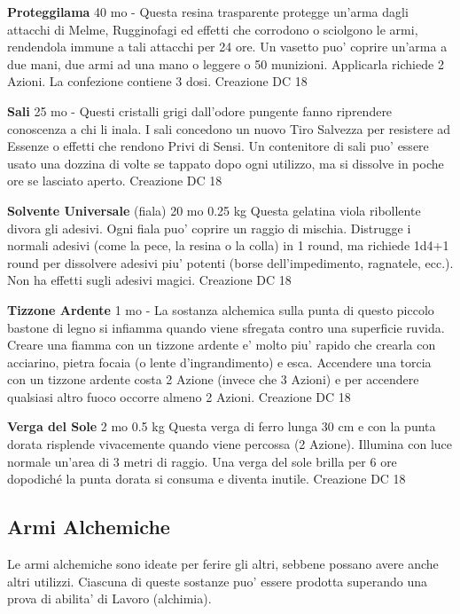 \documentclass[a4paper,11pt,twoside,openany]{book}
\begin{document}
{\textbf{Proteggilama} 40 mo - Questa resina trasparente protegge un'arma dagli attacchi di Melme, Rugginofagi ed effetti che corrodono o sciolgono le armi, rendendola immune a tali attacchi per 24 ore. Un vasetto puo' coprire un'arma a due mani, due armi ad una mano o leggere o 50 munizioni. Applicarla richiede 2 Azioni. La confezione contiene 3 dosi. Creazione DC 18

\textbf{Sali} 25 mo - Questi cristalli grigi dall'odore pungente fanno riprendere conoscenza a chi li inala. I sali concedono un nuovo Tiro Salvezza per resistere ad Essenze o effetti che rendono Privi di Sensi.
Un contenitore di sali puo' essere usato una dozzina di volte se tappato dopo ogni utilizzo, ma si dissolve in poche ore se lasciato aperto. Creazione DC 18

\textbf{Solvente Universale} (fiala) 20 mo 0.25 kg Questa gelatina viola ribollente divora gli adesivi. Ogni fiala puo' coprire un raggio di mischia. Distrugge i normali adesivi (come la pece, la resina o la colla) in 1 round, ma richiede 1d4+1 round per dissolvere adesivi piu' potenti (borse dell'impedimento, ragnatele, ecc.). Non ha effetti sugli adesivi magici. Creazione DC 18

\textbf{Tizzone Ardente} 1 mo - La sostanza alchemica sulla punta di questo piccolo bastone di legno si infiamma quando viene sfregata contro una superficie ruvida. Creare una fiamma con un tizzone ardente e' molto piu' rapido che crearla con acciarino, pietra focaia (o lente d'ingrandimento) e esca. Accendere una torcia con un tizzone ardente costa 2 Azione (invece che 3 Azioni) e per accendere qualsiasi altro fuoco occorre almeno 2 Azioni. Creazione DC 18

\textbf{Verga del Sole} 2 mo 0.5 kg Questa verga di ferro lunga 30 cm e con la punta dorata risplende vivacemente quando viene percossa (2 Azione). Illumina con luce normale un'area di 3 metri di raggio. Una verga del sole brilla per 6 ore dopodiché la punta dorata si consuma e diventa inutile. Creazione DC 18

\pagebreak

\subsection{Armi Alchemiche}

\label{armi-alchemiche}

Le armi alchemiche sono ideate per ferire gli altri, sebbene possano avere anche altri utilizzi. Ciascuna di queste sostanze puo' essere prodotta superando una prova di abilita' di Lavoro (alchimia).

}
\end{document}
